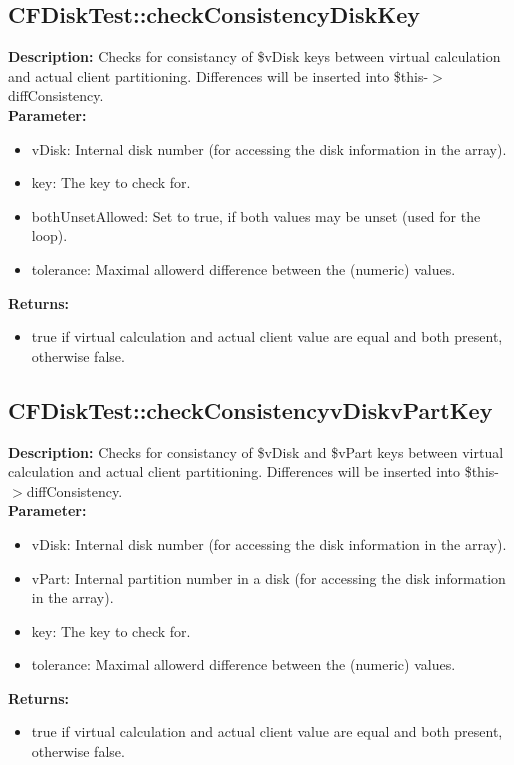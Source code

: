 \subsection{CFDiskTest::checkConsistencyDiskKey}
\textbf{Description:} Checks for consistancy of \$vDisk keys between virtual calculation and actual client partitioning. Differences will be inserted into \$this-$>$diffConsistency.\\
\textbf{Parameter:}
\begin{itemize}
\item vDisk: Internal disk number (for accessing the disk information in the array).
\item key: The key to check for.
\item bothUnsetAllowed: Set to true, if both values may be unset (used for the loop).
\item tolerance: Maximal allowerd difference between the (numeric) values.
\end{itemize}
\textbf{Returns:}
\begin{itemize}
\item true if virtual calculation and actual client value are equal and both present, otherwise false.
\end{itemize}

\subsection{CFDiskTest::checkConsistencyvDiskvPartKey}
\textbf{Description:} Checks for consistancy of \$vDisk and \$vPart keys between virtual calculation and actual client partitioning. Differences will be inserted into \$this-$>$diffConsistency.\\
\textbf{Parameter:}
\begin{itemize}
\item vDisk: Internal disk number (for accessing the disk information in the array).
\item vPart: Internal partition number in a disk (for accessing the disk information in the array).
\item key: The key to check for.
\item tolerance: Maximal allowerd difference between the (numeric) values.
\end{itemize}
\textbf{Returns:}
\begin{itemize}
\item true if virtual calculation and actual client value are equal and both present, otherwise false.
\end{itemize}

